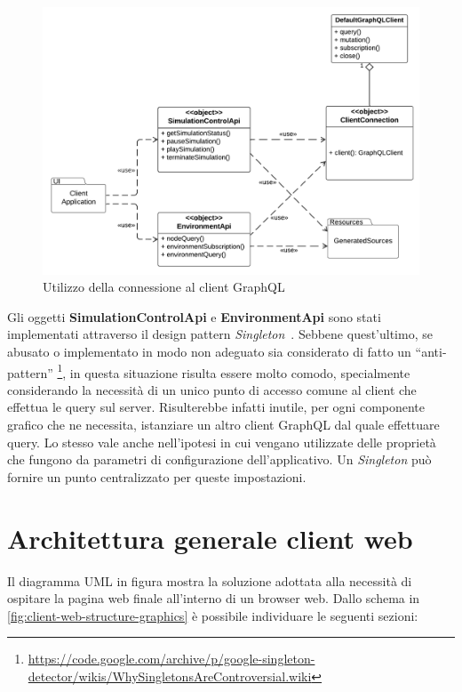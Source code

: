 \begin{figure}[htb]
	\centering
	\includegraphics[scale=0.52]{imgs/General_Architecture_Web_Client.pdf}
	\caption{Utilizzo della connessione al client GraphQL}
	\label{fig:general-client-architecture-graphics}
\end{figure}

Gli oggetti \textbf{SimulationControlApi} e \textbf{EnvironmentApi} sono stati implementati attraverso il design pattern \textit{Singleton}~\cite{Gamma1994}. Sebbene quest'ultimo, se abusato o implementato in modo non adeguato sia considerato di fatto un ``anti-pattern'' \footnote{\url{https://code.google.com/archive/p/google-singleton-detector/wikis/WhySingletonsAreControversial.wiki}}, in questa situazione risulta essere molto comodo, specialmente considerando la necessità di un unico punto di accesso comune al client che effettua le query sul server. Risulterebbe infatti inutile, per ogni componente grafico che ne necessita, istanziare un altro client GraphQL dal quale effettuare query. Lo stesso vale anche nell'ipotesi in cui vengano utilizzate delle proprietà che fungono da parametri di configurazione dell'applicativo. Un \textit{Singleton} può fornire un punto centralizzato per queste impostazioni.

\section{Architettura generale client web}\label{section:client-web-architecture}
Il diagramma UML in figura mostra la soluzione adottata alla necessità di ospitare la pagina web finale all'interno di un browser web. Dallo schema in \cref{fig:client-web-structure-graphics} è possibile individuare le seguenti sezioni:

